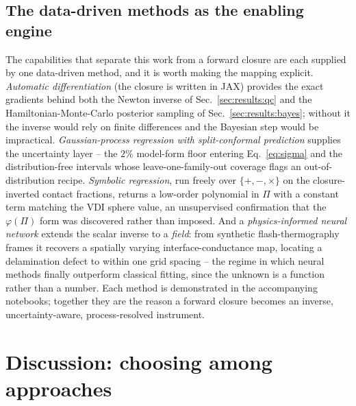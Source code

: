 \documentclass[10pt,a4paper]{article}
\begin{document}
\subsection{The data-driven methods as the enabling engine}
\label{sec:results:engine}
The capabilities that separate this work from a forward closure are each supplied by one data-driven method, and it is worth making the mapping explicit. \emph{Automatic differentiation} (the closure is written in JAX) provides the exact gradients behind both the Newton inverse of Sec.~\ref{sec:results:qc} and the Hamiltonian-Monte-Carlo posterior sampling of Sec.~\ref{sec:results:bayes}; without it the inverse would rely on finite differences and the Bayesian step would be impractical. \emph{Gaussian-process regression with split-conformal prediction} supplies the uncertainty layer -- the $2\%$ model-form floor entering Eq.~\eqref{eq:sigma} and the distribution-free intervals whose leave-one-family-out coverage flags an out-of-distribution recipe. \emph{Symbolic regression}, run freely over $\{+,-,\times\}$ on the closure-inverted contact fractions, returns a low-order polynomial in $\Pi$ with a constant term matching the VDI sphere value, an unsupervised confirmation that the $\varphi(\Pi)$ form was discovered rather than imposed. And a \emph{physics-informed neural network} extends the scalar inverse to a \emph{field}: from synthetic flash-thermography frames it recovers a spatially varying interface-conductance map, locating a delamination defect to within one grid spacing -- the regime in which neural methods finally outperform classical fitting, since the unknown is a function rather than a number. Each method is demonstrated in the accompanying notebooks; together they are the reason a forward closure becomes an inverse, uncertainty-aware, process-resolved instrument.

\section{Discussion: choosing among approaches}
\label{sec:discussion}
\end{document}
